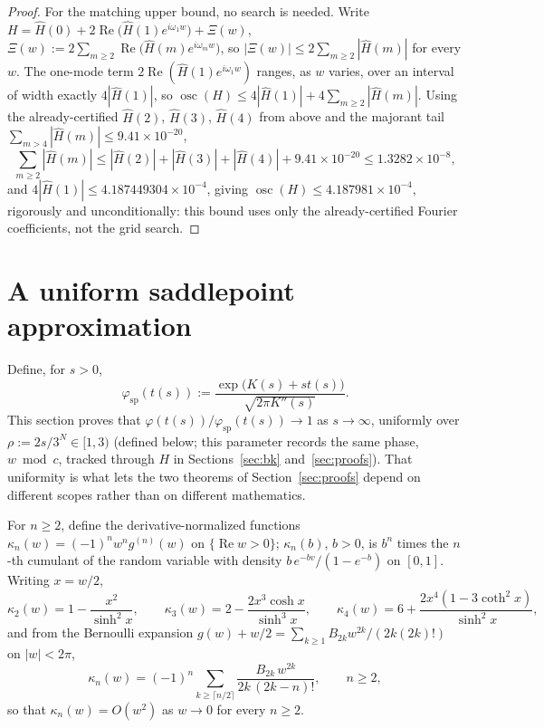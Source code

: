 \documentclass[11pt]{amsart}
\theoremstyle{plain}
\theoremstyle{definition}
\theoremstyle{remark}
\begin{document}
\begin{proof}
For the matching upper bound, no search is needed. Write $H = \hat H(0) + 2\operatorname{Re}\bigl(
\hat H(1)e^{i\omega_1 w}\bigr) + \Xi(w)$, $\Xi(w) := 2\sum_{m\ge2}\operatorname{Re}\bigl(\hat H(m)
e^{i\omega_m w}\bigr)$, so $|\Xi(w)|\le2\sum_{m\ge2}|\hat H(m)|$ for every $w$. The one-mode term
$2\operatorname{Re}(\hat H(1)e^{i\omega_1w})$ ranges, as $w$ varies, over an interval of width
exactly $4|\hat H(1)|$, so $\operatorname{osc}(H) \le 4|\hat H(1)| + 4\sum_{m\ge2}|\hat H(m)|$.
Using the already-certified $\hat H(2)$, $\hat H(3)$, $\hat H(4)$ from above and the majorant tail
$\sum_{m>4}|\hat H(m)|\le9.41\times10^{-20}$,
\[
\sum_{m\ge2}|\hat H(m)| \le |\hat H(2)|+|\hat H(3)|+|\hat H(4)|+9.41\times10^{-20} \le
1.3282\times10^{-8},
\]
and $4|\hat H(1)| \le 4.187449304\times10^{-4}$, giving $\operatorname{osc}(H) \le
4.187981\times10^{-4}$, rigorously and unconditionally: this bound uses only the already-certified
Fourier coefficients, not the grid search.
\end{proof}

\section{A uniform saddlepoint approximation}
\label{sec:formulaA}

Define, for $s>0$,
\[
\varphi_{\mathrm{sp}}(t(s)) := \frac{\exp\bigl(K(s)+st(s)\bigr)}{\sqrt{2\pi K''(s)}}.
\]
This section proves that $\varphi(t(s))/\varphi_{\mathrm{sp}}(t(s)) \to 1$ as $s \to \infty$,
uniformly over $\rho:=2s/3^N\in[1,3)$ (defined below; this parameter records the same phase,
$w\bmod c$, tracked through $H$ in Sections~\ref{sec:bk} and~\ref{sec:proofs}). That uniformity is
what lets the two theorems of Section~\ref{sec:proofs} depend on different scopes rather than on
different mathematics.

For $n \ge 2$, define the derivative-normalized functions $\kappa_n(w) = (-1)^n w^n g^{(n)}(w)$ on
$\{\operatorname{Re} w > 0\}$; $\kappa_n(b)$, $b>0$, is $b^n$ times the $n$-th cumulant of the
random variable with density $b\,e^{-bv}/(1-e^{-b})$ on $[0,1]$. Writing $x=w/2$,
\[
\kappa_2(w) = 1 - \frac{x^2}{\sinh^2 x}, \qquad
\kappa_3(w) = 2 - \frac{2x^3\cosh x}{\sinh^3 x}, \qquad
\kappa_4(w) = 6 + \frac{2x^4(1-3\coth^2 x)}{\sinh^2 x},
\]
and from the Bernoulli expansion $g(w)+w/2 = \sum_{k\ge1} B_{2k}w^{2k}/(2k(2k)!)$ on $|w|<2\pi$,
\[
\kappa_n(w) = (-1)^n\!\!\sum_{k\ge\lceil n/2\rceil}\!\! \frac{B_{2k}\,w^{2k}}{2k\,(2k-n)!}, \qquad n\ge2,
\]
so that $\kappa_n(w) = O(w^2)$ as $w \to 0$ for every $n \ge 2$.
\end{document}
